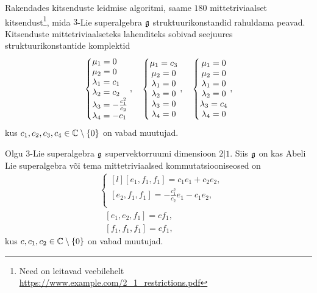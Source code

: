 Rakendades kitsenduste leidmise algoritmi, saame $180$ mittetriviaalset
kitsendust\footnote{Need on leitavad veebilehelt
\url{https://www.example.com/2_1_restrictions.pdf}},
mida $3$-Lie superalgebra $\mathfrak{g}$ struktuurikonstandid rahuldama peavad.
Kitsenduste mittetriviaalseteks lahenditeks sobivad seejuures
struktuurikonstantide komplektid
\renewcommand\arraystretch{1.3}
\begin{align*}
    \left\{ \begin{matrix*}[l]
        \m_1 = 0 \\
        \m_2 = 0 \\
        \l_1 = c_1 \\
        \l_2 = c_2 \\
        \l_3 = -\frac{c_1^2}{c_2} \\
        \l_4 = -c_1 \\
    \end{matrix*} \right.,
    \quad
    \left\{ \begin{matrix*}
        \m_1 = c_3 \\
        \m_2 = 0 \\
        \l_1 = 0 \\
        \l_2 = 0 \\
        \l_3 = 0 \\
        \l_4 = 0 \\
    \end{matrix*} \right.,
    \quad
    \left\{ \begin{matrix*}
        \m_1 = 0 \\
        \m_2 = 0 \\
        \l_1 = 0 \\
        \l_2 = 0 \\
        \l_3 = c_4 \\
        \l_4 = 0 \\
    \end{matrix*} \right.,
\end{align*}
\renewcommand\arraystretch{1}
kus $c_1, c_2, c_3, c_4 \in \mathbb{C} \setminus \{0\}$ on vabad muutujad.

\begin{thm}
    Olgu $3$-Lie superalgebra $\mathfrak{g}$ supervektorruumi dimensioon $2|1$.
    Siis $\mathfrak{g}$ on kas Abeli Lie superalgebra või tema mittetriviaalsed
    kommutatsiooniseosed on
    \renewcommand\arraystretch{1.2}
    \begin{align}
        & \left\{
            \begin{matrix*}[l]
                [e_1, f_1, f_1] = c_1 e_1 + c_2 e_2, \\
                [e_2, f_1, f_1] = -\frac{c_1^2}{c_2} e_1 - c_1 e_2, \\
            \end{matrix*}
        \right. \\[0.2cm]
        &\ \ \ [e_1, e_2, f_1] = c f_1, \\[0.2cm]
        &\ \ \ [f_1, f_1, f_1] = c f_1,
    \end{align}
    \renewcommand\arraystretch{1}
    kus $c, c_1, c_2 \in \mathbb{C} \setminus \{ 0 \}$ on vabad muutujad.
\end{thm}

